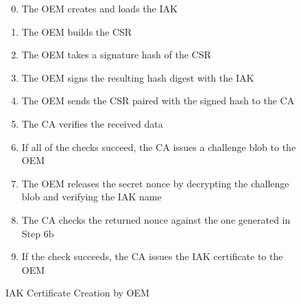 \documentclass[runningheads]{llncs}
\begin{document}
\begin{figure}[hbtp]
\begin{enumerate}[itemsep=0pt,parsep=0pt,partopsep=0pt]
  \setcounter{enumi}{-1}
  \item The OEM creates and loads the IAK
  \item The OEM builds the CSR%
  \item The OEM takes a signature hash of the CSR
  \item The OEM signs the resulting hash digest with the IAK
  \item The OEM sends the CSR paired with the signed hash to the CA
  \item The CA verifies the received data%
  \item If all of the checks succeed, the CA issues a challenge blob to the OEM%
  \item The OEM releases the secret nonce by decrypting the challenge
    blob and verifying the IAK name
  \item The CA checks the returned nonce against the one generated in Step 6b
  \item If the check succeeds, the CA issues the IAK certificate to the OEM
  \end{enumerate}
  \caption{IAK Certificate Creation by OEM}
  \label{fig:iak-creation}
\end{figure}
\end{document}
